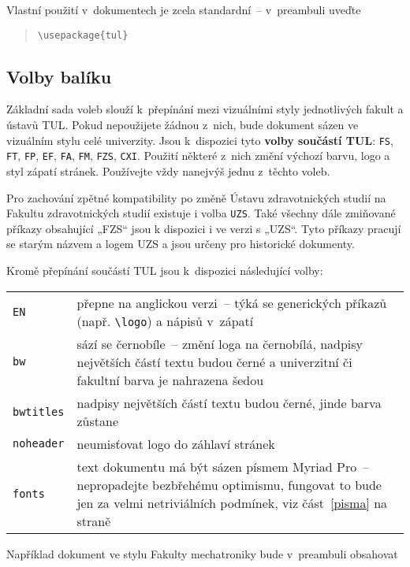 \documentclass[a4paper,12pt,twoside]{article}
\makeatletter
\newcommand{\cmdfont}[1]{\texttt{\color{\tulcolor}#1}}
\newcommand{\cmdnoindex}[1]{\cmdfont{\textbackslash #1}}
\newcommand{\cmd}[1]{\cmdnoindex{#1}\index{#1@\textbackslash #1}}
\makeatother
\begin{document}
Vlastní použití v~dokumentech je zcela standardní~-- v~preambuli uveďte

\begin{quote}
\cmdnoindex{usepackage\{tul\}}
\end{quote}

\subsection*{Volby balíku}

Základní sada voleb slouží k~přepínání mezi vizuálními styly jednotlivých
fakult a ústavů TUL. Pokud nepoužijete žádnou z~nich, bude dokument sázen ve
vizuálním stylu celé univerzity. Jsou k~dispozici tyto \textbf{volby součástí
TUL}: \cmdfont{FS}, \cmdfont{FT}, \cmdfont{FP}, \cmdfont{EF}, \cmdfont{FA},
\cmdfont{FM}, \cmdfont{FZS}, \cmdfont{CXI}. Použití některé z~nich změní
výchozí barvu, logo a styl zápatí stránek. Používejte vždy nanejvýš jednu
z~těchto voleb.

Pro zachování zpětné kompatibility po změně Ústavu zdravotnických studií na
Fakultu zdravotnických studií existuje i volba \cmdfont{UZS}. Také všechny dále
zmiňované příkazy obsahující „FZS“ jsou k dispozici i ve verzi s „UZS“. Tyto
příkazy pracují se starým názvem a logem UZS a jsou určeny pro historické
dokumenty.

Kromě přepínání součástí TUL jsou k~dispozici následující volby:

\medskip

\begin{tabularx}{\textwidth}{@{}lX}
\cmdfont{EN} & přepne na anglickou verzi~-- týká se generických příkazů
(např. \cmd{logo}) a nápisů v~zápatí\\
\cmdfont{bw} & sází se černobíle~-- změní loga na černobílá, nadpisy největších
částí textu budou černé a univerzitní či fakultní barva je nahrazena šedou \\
\cmdfont{bwtitles} & nadpisy největších částí textu budou černé, jinde barva zůstane \\
\cmdfont{noheader} & neumisťovat logo do záhlaví stránek \\
\cmdfont{fonts} & text dokumentu má být sázen písmem Myriad Pro~-- nepropadejte
bezbřehému optimismu, fungovat to bude jen za velmi netriviálních podmínek, viz
část~\ref{pisma} na straně~\pageref{pisma}
\end{tabularx}

\medskip

Například dokument ve stylu Fakulty mechatroniky bude v~preambuli obsahovat
\end{document}
